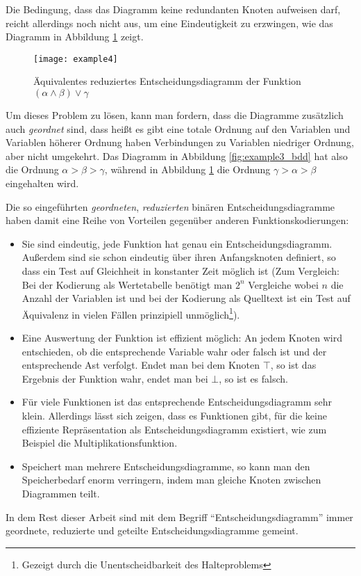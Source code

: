 Die Bedingung, dass das Diagramm keine redundanten Knoten aufweisen darf, reicht allerdings noch nicht aus, um eine Eindeutigkeit zu erzwingen, wie das Diagramm in Abbildung \ref{fig:example4_bdd} zeigt.
\begin{figure}[h]
  \centering
  \texttt{[image: example4]}
  \caption{Äquivalentes reduziertes Entscheidungsdiagramm der Funktion $(\alpha\land\beta)\lor \gamma$}
  \label{fig:example4_bdd}
\end{figure}

Um dieses Problem zu lösen, kann man fordern, dass die Diagramme zusätzlich auch \emph{geordnet} sind, dass heißt es gibt eine totale Ordnung auf den Variablen und Variablen höherer Ordnung haben Verbindungen zu Variablen niedriger Ordnung, aber nicht umgekehrt.
Das Diagramm in Abbildung \ref{fig:example3_bdd} hat also die Ordnung $\alpha > \beta > \gamma$, während in Abbildung \ref{fig:example4_bdd} die Ordnung $\gamma > \alpha > \beta$ eingehalten wird.

Die so eingeführten \emph{geordneten}, \emph{reduzierten} binären Entscheidungsdiagramme haben damit eine Reihe von Vorteilen gegenüber anderen Funktionskodierungen:
\begin{itemize}
\item Sie sind eindeutig, jede Funktion hat genau ein Entscheidungsdiagramm.
  Außerdem sind sie schon eindeutig über ihren Anfangsknoten definiert, so dass ein Test auf Gleichheit in konstanter Zeit möglich ist (Zum Vergleich: Bei der Kodierung als Wertetabelle benötigt man $2^n$ Vergleiche wobei $n$ die Anzahl der Variablen ist und bei der Kodierung als Quelltext ist ein Test auf Äquivalenz in vielen Fällen prinzipiell unmöglich\footnote{Gezeigt durch die Unentscheidbarkeit des Halteproblems\cite{halteproblem}}).
\item Eine Auswertung der Funktion ist effizient möglich:
  An jedem Knoten wird entschieden, ob die entsprechende Variable wahr oder falsch ist und der entsprechende Ast verfolgt.
  Endet man bei dem Knoten $\top$, so ist das Ergebnis der Funktion wahr, endet man bei $\bot$, so ist es falsch.
\item Für viele Funktionen ist das entsprechende Entscheidungsdiagramm sehr klein.
  Allerdings lässt sich zeigen, dass es Funktionen gibt, für die keine effiziente Repräsentation als Entscheidungsdiagramm existiert, wie zum Beispiel die Multiplikationsfunktion\cite{Bryant98onthe}.
\item Speichert man mehrere Entscheidungsdiagramme, so kann man den Speicherbedarf enorm verringern, indem man gleiche Knoten zwischen Diagrammen teilt.
\end{itemize}

In dem Rest dieser Arbeit sind mit dem Begriff "`Entscheidungsdiagramm"' immer geordnete, reduzierte und geteilte Entscheidungsdiagramme gemeint.